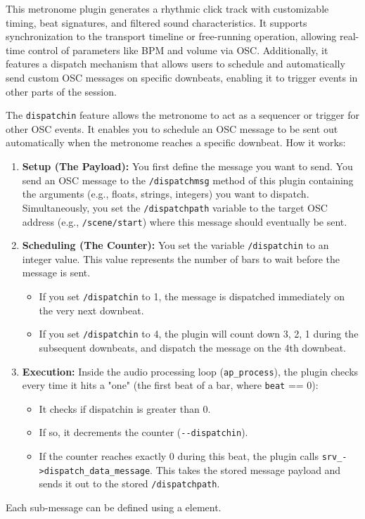 This metronome plugin generates a rhythmic click track with
customizable timing, beat signatures, and filtered sound
characteristics. It supports synchronization to the transport timeline
or free-running operation, allowing real-time control of parameters
like BPM and volume via OSC. Additionally, it features a dispatch
mechanism that allows users to schedule and automatically send custom
OSC messages on specific downbeats, enabling it to trigger events in
other parts of the session.







The \verb!dispatchin! feature allows the metronome to act as a
sequencer or trigger for other OSC events. It enables you to schedule
an OSC message to be sent out automatically when the metronome reaches
a specific downbeat. How it works:

\begin{enumerate} 
\item {\bf Setup (The Payload):} You first define the message you want to send. You send an OSC message to the \verb!/dispatchmsg! method of this plugin containing the arguments (e.g., floats, strings, integers) you want to dispatch. Simultaneously, you set the \verb!/dispatchpath! variable to the target OSC address (e.g., \verb!/scene/start!) where this message should eventually be sent.
\item {\bf Scheduling (The Counter):} You set the variable \verb!/dispatchin! to an integer value. This value represents the number of bars to wait before the message is sent.
\begin{itemize}
\item If you set \verb!/dispatchin! to 1, the message is dispatched immediately on the very next downbeat.
\item If you set \verb!/dispatchin! to 4, the plugin will count down 3, 2, 1 during the subsequent downbeats, and dispatch the message on the 4th downbeat.
\end{itemize}
\item {\bf Execution:} Inside the audio processing loop (\verb!ap_process!), the plugin checks every time it hits a "one" (the first beat of a bar, where \verb!beat! == 0):
\begin{itemize}
\item It checks if dispatchin is greater than 0.
\item If so, it decrements the counter (\verb!--dispatchin!).
\item If the counter reaches exactly 0 during this beat, the plugin calls \verb!srv_->dispatch_data_message!. This takes the stored message payload and sends it out to the stored \verb!/dispatchpath!.
\end{itemize}
\end{enumerate}


Each sub-message can be defined using a  element.


